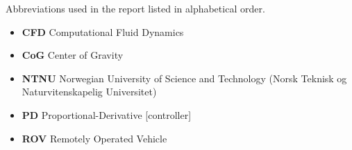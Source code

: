 Abbreviations used in the report listed in alphabetical order.
\begin{itemize}
    \item \textbf{CFD} Computational Fluid Dynamics
    \item \textbf{CoG} Center of Gravity
    \item \textbf{NTNU} Norwegian University of Science and Technology (Norsk Teknisk og Naturvitenskapelig Universitet)   
     \item \textbf{PD} Proportional-Derivative [controller]
    \item \textbf{ROV} Remotely Operated Vehicle
\end{itemize}